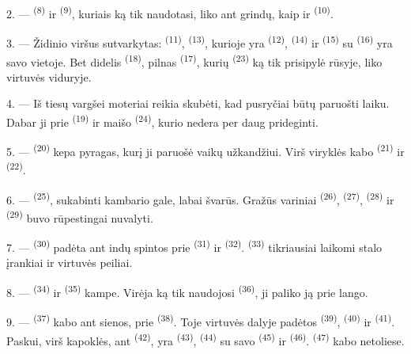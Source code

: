 2. ---  \textsuperscript{(8)} ir 
\textsuperscript{(9)}, kuriais ką tik naudotasi, liko ant grindų, kaip ir
 \textsuperscript{(10)}.

3. --- Židinio viršus sutvarkytas:  \textsuperscript{(11)},
 \textsuperscript{(13)}, kurioje yra 
\textsuperscript{(12)},  \textsuperscript{(14)} ir
 \textsuperscript{(15)} su  \textsuperscript{(16)}
yra savo vietoje. Bet didelis  \textsuperscript{(18)}, pilnas
 \textsuperscript{(17)}, kurių 
\textsuperscript{(23)} ką tik prisipylė rūsyje, liko virtuvės viduryje.

4. --- Iš tiesų vargšei moteriai reikia skubėti, kad pusryčiai būtų paruošti laiku.
Dabar ji prie  \textsuperscript{(19)} ir maišo 
\textsuperscript{(24)}, kurio nedera per daug prideginti.

5. ---  \textsuperscript{(20)} kepa pyragas, kurį ji paruošė
vaikų užkandžiui. Virš viryklės kabo  \textsuperscript{(21)} ir
 \textsuperscript{(22)}.

\VUsaut{4.0mm}
\VUsaut{3.0mm}

6. ---  \textsuperscript{(25)}, sukabinti kambario gale,
labai švarūs. Gražūs variniai  \textsuperscript{(26)},
 \textsuperscript{(27)},  \textsuperscript{(28)} ir
 \textsuperscript{(29)} buvo rūpestingai nuvalyti.

7. ---  \textsuperscript{(30)} padėta ant indų spintos prie
 \textsuperscript{(31)} ir 
\textsuperscript{(32)}.  \textsuperscript{(33)} tikriausiai laikomi
stalo įrankiai ir virtuvės peiliai.

8. ---  \textsuperscript{(34)} ir 
\textsuperscript{(35)} kampe. Virėja ką tik naudojosi 
\textsuperscript{(36)}, ji paliko ją prie lango.

9. ---  \textsuperscript{(37)} kabo ant sienos, prie
 \textsuperscript{(38)}. Toje virtuvės dalyje padėtos
 \textsuperscript{(39)},  \textsuperscript{(40)} ir
 \textsuperscript{(41)}. Paskui, virš kapoklės, ant
 \textsuperscript{(42)}, yra 
\textsuperscript{(43)},  \textsuperscript{(44)} su savo
 \textsuperscript{(45)} ir  \textsuperscript{(46)}.
 \textsuperscript{(47)} kabo netoliese.

